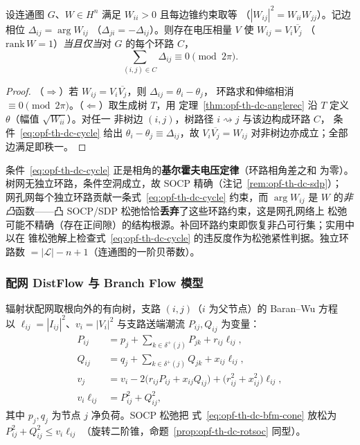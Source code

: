 \begin{proposition}\label{prop:opf-th-dc-cycle}
设连通图 $G$、$W\in H^n$ 满足 $W_{ii}>0$ 且每边锥约束取等
（$|W_{ij}|^2=W_{ii}W_{jj}$）。记边相位 $\Delta_{ij}=\arg W_{ij}$
（$\Delta_{ji}=-\Delta_{ij}$）。则存在电压相量 $V$ 使 $W_{ij}=V_i\overline{V_j}$
（$\mathrm{rank}\,W=1$）\emph{当且仅当}对 $G$ 的每个环路 $C$，
\begin{equation}
\sum_{(i,j)\in C}\Delta_{ij}\equiv0\pmod{2\pi}.
\label{eq:opf-th-dc-cycle}
\end{equation}
\end{proposition}
\begin{proof}
（$\Rightarrow$）若 $W_{ij}=V_i\overline{V_j}$，则 $\Delta_{ij}=\theta_i-\theta_j$，
环路求和伸缩相消 $\equiv0\pmod{2\pi}$。（$\Leftarrow$）取生成树 $T$，用
定理~\ref{thm:opf-th-dc-anglerec} 沿 $T$ 定义 $\theta$（幅值 $\sqrt{W_{ii}}$）。对任一
非树边 $(i,j)$，树路径 $i\rightsquigarrow j$ 与该边构成环路 $C$，
条件~\eqref{eq:opf-th-dc-cycle} 给出 $\theta_i-\theta_j\equiv\Delta_{ij}$，故
$V_i\overline{V_j}=W_{ij}$ 对非树边亦成立；全部边满足即秩一。
\end{proof}

\begin{remark}\label{rem:opf-th-dc-cycle}
条件~\eqref{eq:opf-th-dc-cycle} 正是相角的\textbf{基尔霍夫电压定律}（环路相角差之和
为零）。树网无独立环路，条件空洞成立，故 SOCP 精确（注记~\ref{rem:opf-th-dc-sdp}）；
网孔网每个独立环路贡献一条式~\eqref{eq:opf-th-dc-cycle} 约束，而 $\arg W_{ij}$ 是 $W$
的\emph{非凸}函数——凸 SOCP/SDP 松弛恰恰\textbf{丢弃}了这些环路约束，这是网孔网络上
松弛可能不精确（存在正间隙）的结构根源。补回环路约束即恢复非凸可行集；实用中以在
锥松弛解上检查式~\eqref{eq:opf-th-dc-cycle} 的违反度作为松弛紧性判据。独立环路数
$=|\mathcal L|-n+1$（连通图的一阶贝蒂数）。
\end{remark}

\subsubsection{配网 DistFlow 与 Branch Flow 模型}

\begin{definition}\label{def:opf-th-dc-bfm}
辐射状配网取根向外的有向树，支路 $(i,j)$（$i$ 为父节点）的
Baran--Wu 方程~\cite{opfdc:baran-wu,opfdc:farivar-low} 以
$\ell_{ij}=|I_{ij}|^2$、$v_i=|V_i|^2$ 与支路送端潮流 $P_{ij},Q_{ij}$
为变量：
\begin{align}
P_{ij}&=p_j+\sum_{k\in\delta^+(j)}P_{jk}+r_{ij}\ell_{ij},
\label{eq:opf-th-dc-bfm-p}\\
Q_{ij}&=q_j+\sum_{k\in\delta^+(j)}Q_{jk}+x_{ij}\ell_{ij},
\label{eq:opf-th-dc-bfm-q}\\
v_j&=v_i-2\bigl(r_{ij}P_{ij}+x_{ij}Q_{ij}\bigr)
+\bigl(r_{ij}^2+x_{ij}^2\bigr)\ell_{ij},
\label{eq:opf-th-dc-bfm-v}\\
v_i\ell_{ij}&=P_{ij}^2+Q_{ij}^2,
\label{eq:opf-th-dc-bfm-cone}
\end{align}
其中 $p_j,q_j$ 为节点 $j$ 净负荷。SOCP 松弛把
式~\eqref{eq:opf-th-dc-bfm-cone} 放松为 $P_{ij}^2+Q_{ij}^2\le v_i\ell_{ij}$
（旋转二阶锥，命题~\ref{prop:opf-th-dc-rotsoc} 同型）。
\end{definition}

